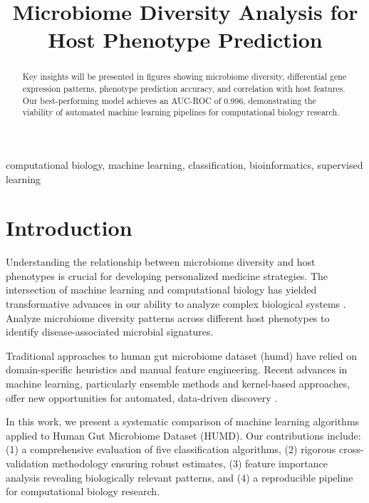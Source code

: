 \documentclass[conference]{IEEEtran}
\begin{document}
\title{Microbiome Diversity Analysis for Host Phenotype Prediction}

\author{
}

\maketitle

\begin{abstract}
Key insights will be presented in figures showing microbiome diversity, differential gene expression patterns, phenotype prediction accuracy, and correlation with host features.
Our best-performing model achieves an AUC-ROC of 0.996,
demonstrating the viability of automated machine learning pipelines for computational biology research.
\end{abstract}

\begin{IEEEkeywords}
computational biology, machine learning, classification, bioinformatics, supervised learning
\end{IEEEkeywords}

\section{Introduction}

Understanding the relationship between microbiome diversity and host phenotypes is crucial for developing personalized medicine strategies.
The intersection of machine learning and computational biology has yielded transformative advances
in our ability to analyze complex biological systems \cite{lecun2015deep}.
Analyze microbiome diversity patterns across different host phenotypes to identify disease-associated microbial signatures.

Traditional approaches to human gut microbiome dataset (humd) have relied on domain-specific heuristics
and manual feature engineering. Recent advances in machine learning, particularly ensemble methods
and kernel-based approaches, offer new opportunities for automated, data-driven discovery \cite{breiman2001random}.

In this work, we present a systematic comparison of machine learning algorithms applied to
Human Gut Microbiome Dataset (HUMD). Our contributions include: (1) a comprehensive evaluation of five
classification algorithms, (2) rigorous cross-validation methodology ensuring robust estimates,
(3) feature importance analysis revealing biologically relevant patterns, and
(4) a reproducible pipeline for computational biology research.
\end{document}
